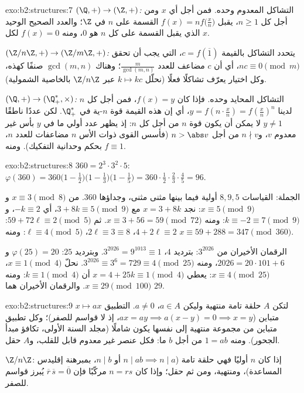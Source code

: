 \begin{solution}{exo:b2:structures:7}
\emph{$(\Q,+) \to (\Z,+)$:} التشاكل المعدوم وحده. فمن أجل أي $x$ ومن أجل
كل $n \geq 1$، يقبل $f(x) = n f\bigl(\frac xn\bigr)$ القسمة
على $n$ في $\Z$؛ والعدد الصحيح الوحيد الذي يقبل القسمة على كل $n$ هو $0$، ومنه
$f(x) = 0$ لكل $x$.

\emph{$(\Z/n\Z, +) \to (\Z/m\Z, +)$:} يتحدد التشاكل بالقيمة
$c = f(\overline 1)$، التي يجب أن تحقق $n c \equiv 0 \pmod m$،
أي أن $c$ مضاعف للعدد $\frac{m}{\gcd(m,n)}$؛ وهناك
$\gcd(m,n)$ صنفًا كهذه، وكل اختيار يعرّف تشاكلًا فعلًا
(نحلّل $k \mapsto kc$ عبر $\Z/n\Z$ بالخاصية الشمولية).

\emph{$(\Q, +) \to (\Q_+^*, \times)$:} التشاكل المحايد وحده. فإذا كان
$f(x) = y$، فمن أجل كل $n$ لدينا $y = f(n \cdot \frac xn) =
f(\frac xn)^n$، أي إن هذه القيمة قوة $n$-ية في $\Q_+^*$. لكن عددًا ناطقًا
$y \neq 1$ لا يمكن أن يكون قوة $n$ من أجل كل $n$: إذ يظهر عدد أولي ما
في $y$ بأس غير معدوم $v$، و$n \nmid v$ من أجل $n > \abs
v$ (فأسس القوى ذوات الأس $n$ مضاعفات للعدد $n$، بحكم وحدانية
التفكيك). ومنه $f \equiv 1$.
\end{solution}

\begin{solution}{exo:b2:structures:8}
$360 = 2^3 \cdot 3^2 \cdot 5$:
$\varphi(360) = 360\bigl(1 - \tfrac12\bigr)\bigl(1 -
\tfrac13\bigr)\bigl(1 - \tfrac15\bigr) = 360 \cdot \tfrac12 \cdot
\tfrac23 \cdot \tfrac45 = 96$.

الجملة: القياسات $8, 9, 5$ أولية فيما بينها مثنى مثنى، وجداؤها $360$. من $x
\equiv 3 \pmod 8$ و$x \equiv 5 \pmod 9$: نجد $x = 3 + 8k$ مع $3 +
8k \equiv 5 \pmod 9$، أي $-k \equiv 2$، و$k \equiv -2 \equiv 7
\pmod 9$: ومنه $x \equiv 3 + 56 = 59 \pmod{72}$. ثم $59 + 72\ell \equiv
2 \pmod 5$: $4 + 2\ell \equiv 2$، $2\ell \equiv 3 \equiv 8$، $\ell
\equiv 4 \pmod 5$: ومنه $x \equiv 59 + 288 = 347 \pmod{360}$.

الرقمان الأخيران من $3^{2026}$: بترديد $4$، $3^{2026} = 9^{1013} \equiv
1$. وبترديد $25$: $\varphi(25) = 20$ و$2026 = 20\cdot101 + 6$، ومنه
$3^{2026} \equiv 3^6 = 729 \equiv 4 \pmod{25}$. نحلّ $x \equiv 1
\pmod 4$، $x \equiv 4 \pmod{25}$: يعطي $x = 4 + 25k \equiv 1 \pmod 4$
أن $k \equiv 1 \pmod 4$: ومنه $x \equiv 29 \pmod{100}$. والرقمان الأخيران
هما $29$.
\end{solution}

\begin{solution}{exo:b2:structures:9}
لتكن $A$ حلقة تامة منتهية وليكن $a \in A$، $a \neq 0$.
التطبيق $x \mapsto ax$ متباين ($ax = ay \implies a(x - y) = 0
\implies x = y$، إذ لا قواسم للصفر)؛ وكل تطبيق متباين من مجموعة منتهية
إلى نفسها يكون شاملًا (مجلد السنة الأولى، تكافؤ مبدأ الجحور).
ومنه $1 = ab$ من أجل $b$ ما: فكل عنصر غير معدوم قابل للقلب، و$A$
حقل.

$\Z/n\Z$: إذا كان $n$ أوليًا فهي حلقة تامة ($n \mid ab
\implies n \mid a$ أو $n \mid b$، بمبرهنة إقليدس المساعدة)، ومنتهية، ومن ثم
حقل؛ وإذا كان $n = rs$ مركّبًا فإن $\overline r\,\overline s =
\overline 0$ يُبرز قواسم للصفر.
\end{solution}

